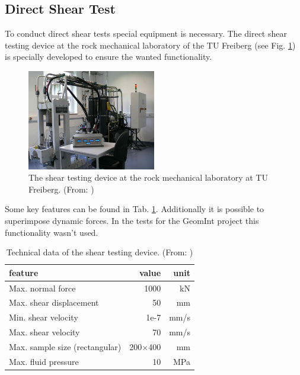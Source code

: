 \subsection{Direct Shear Test}

To conduct direct shear tests special equipment is necessary. The direct shear testing device at the rock mechanical laboratory of the TU Freiberg (see Fig. \ref{fig:ExpCNLShearMachine}) is specially developed to ensure the wanted functionality.\\

\begin{figure}[!ht]
\begin{center}
\includegraphics[width=0.5\textwidth]{./figures/ExpShearMachine.jpg}
\end{center}
\caption{The shear testing device at the rock mechanical laboratory at TU Freiberg. (From: \cite{Konietzky2012})}
\label{fig:ExpCNLShearMachine}
\end{figure}

Some key features can be found in Tab. \ref{table:ExpCNLDeviceTechnicalData}. Additionally it is possible to superimpose dynamic forces. In the tests for the GeomInt project this functionality wasn't used.\\

\begin{table}[!ht]
\begin{center}
\begin{tabular}{l r r}
feature & value & unit\\
\hline
Max. normal force & 1000 & kN\\
Max. shear displacement & 50 &mm\\
Min. shear velocity & 1e-7 & mm/s\\
Max. shear velocity & 70 & mm/s\\
Max. sample size (rectangular) & 200$\times$400 & mm\\
Max. fluid pressure & 10 & MPa\\
\end{tabular}
\caption{Technical data of the shear testing device. (From: \cite{Konietzky2012})}
\label{table:ExpCNLDeviceTechnicalData}
\end{center}
\end{table}

